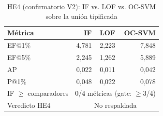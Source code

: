 \begin{table}[htbp]
\centering
\small
\caption{HE4 (confirmatorio V2): IF vs. LOF vs. OC-SVM sobre la unión tipificada}
\label{tab:v2-he4-comparison}
\begin{tabular}{lrrr}
\toprule
Métrica & IF & LOF & OC-SVM \\
\midrule
  EF@1\% & 4,781 & 2,223 & 7,848 \\
  EF@5\% & 2,245 & 1,262 & 5,889 \\
  AP & 0,022 & 0,011 & 0,042 \\
  P@1\% & 0,048 & 0,022 & 0,078 \\
\midrule
  IF $\geq$ comparadores & \multicolumn{3}{c}{0/4 métricas (gate: $\geq 3$/4)} \\
  Veredicto HE4 & \multicolumn{3}{c}{No respaldada} \\
\bottomrule
\end{tabular}
\end{table}

